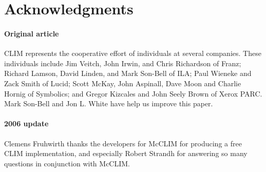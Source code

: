 \documentclass[twocolumn,a4paper]{article}
\newcommand {\CLIM}{{\small CLIM}}
\begin{document}
\section*{Acknowledgments}

\paragraph*{Original article} \CLIM{} represents the cooperative
effort of individuals at several companies. These individuals include
Jim Veitch, John Irwin, and Chris Richardson of Franz; Richard Lamson,
David Linden, and Mark Son-Bell of ILA; Paul Wieneke and Zack Smith of
Lucid; Scott McKay, John Aspinall, Dave Moon and Charlie Hornig of
Symbolics; and Gregor Kizcales and John Seely Brown of Xerox PARC.
Mark Son-Bell and Jon L. White have help us improve this paper.

\paragraph*{2006 update} Clemens Fruhwirth thanks the developers for
McCLIM for producing a free \CLIM{} implementation, and especially
Robert Strandh for answering so many questions in conjunction with
McCLIM.



\end{document}
